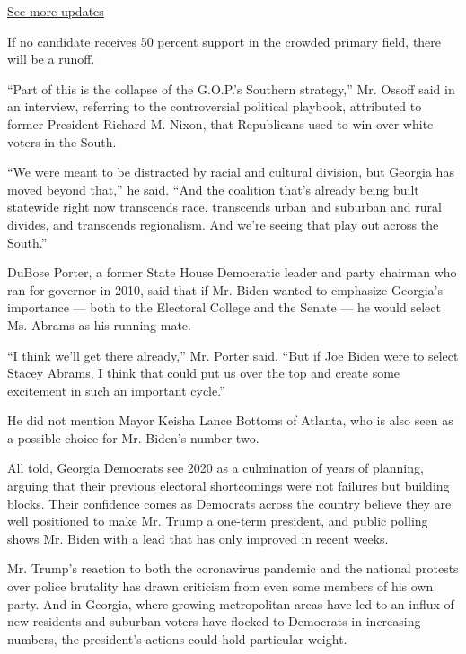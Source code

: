 \href{https://www.nytimes.com/2020/08/04/us/elections/primary-election-michigan-arizona-kansas.html?action=click\&pgtype=Article\&state=default\&region=MAIN_CONTENT_1\&context=storylines_live_updates}{See
more updates}

If no candidate receives 50 percent support in the crowded primary
field, there will be a runoff.

``Part of this is the collapse of the G.O.P.'s Southern strategy,'' Mr.
Ossoff said in an interview, referring to the controversial political
playbook, attributed to former President Richard M. Nixon, that
Republicans used to win over white voters in the South.

``We were meant to be distracted by racial and cultural division, but
Georgia has moved beyond that,'' he said. ``And the coalition that's
already being built statewide right now transcends race, transcends
urban and suburban and rural divides, and transcends regionalism. And
we're seeing that play out across the South.''

DuBose Porter, a former State House Democratic leader and party chairman
who ran for governor in 2010, said that if Mr. Biden wanted to emphasize
Georgia's importance --- both to the Electoral College and the Senate
--- he would select Ms. Abrams as his running mate.

``I think we'll get there already,'' Mr. Porter said. ``But if Joe Biden
were to select Stacey Abrams, I think that could put us over the top and
create some excitement in such an important cycle.''

He did not mention Mayor Keisha Lance Bottoms of Atlanta, who is also
seen as a possible choice for Mr. Biden's number two.

All told, Georgia Democrats see 2020 as a culmination of years of
planning, arguing that their previous electoral shortcomings were not
failures but building blocks. Their confidence comes as Democrats across
the country believe they are well positioned to make Mr. Trump a
one-term president, and public polling shows Mr. Biden with a lead that
has only improved in recent weeks.

Mr. Trump's reaction to both the coronavirus pandemic and the national
protests over police brutality has drawn criticism from even some
members of his own party. And in Georgia, where growing metropolitan
areas have led to an influx of new residents and suburban voters have
flocked to Democrats in increasing numbers, the president's actions
could hold particular weight.

